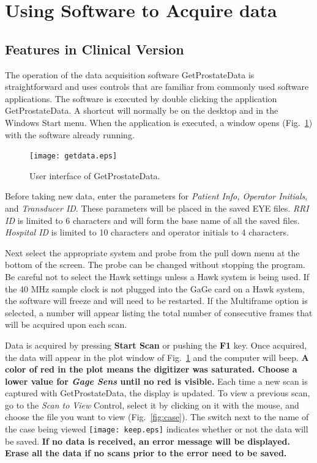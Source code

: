 \documentclass[10pt]{article}
\begin{document}
\section{Using Software to Acquire data}

\subsection{Features in Clinical Version}

The operation of the data acquisition software GetProstateData is
straightforward and uses controls that are familiar from commonly
used software applications. The software is executed by double
clicking the application GetProstateData. A shortcut will normally
be on the desktop and in the Windows Start menu. When the
application is executed, a window opens (Fig.~\ref{fig:getdata})
with the software already running.

\begin{figure}[htb]
\begin{center}
\texttt{[image: getdata.eps]}
 \caption{User interface of GetProstateData.}
 \label{fig:getdata}
\end{center}
\end{figure}

Before taking new data, enter the parameters for {\it Patient
Info, Operator Initials}, and {\it Transducer ID}. These
parameters will be placed in the saved EYE files. {\it RRI ID} is
limited to 6 characters and will form the base name of all the
saved files. {\it Hospital ID} is limited to 10 characters and
operator initials to 4 characters.

Next select the appropriate system and probe from the pull down
menu at the bottom of the screen. The probe can be changed without
stopping the program. Be careful not to select the Hawk settings
unless a Hawk system is being used. If the 40 MHz sample clock is
not plugged into the GaGe card on a Hawk system, the software will
freeze and will need to be restarted. If the Multiframe option is
selected, a number will appear listing the total number of
consecutive frames that will be acquired upon each scan.

Data is acquired by pressing {\bf Start Scan} or pushing the {\bf
F1} key. Once acquired, the data will appear in the plot window of
Fig.~\ref{fig:getdata} and the computer will beep. {\bf A color of
red in the plot means the digitizer was saturated. Choose a lower
value for {\it Gage Sens} until no red is visible.} Each time a
new scan is captured with GetProstateData, the display is updated.
To view a previous scan, go to the {\it Scan to View} Control,
select it by clicking on it with the mouse, and choose the file
you want to view (Fig.~\ref{fig:case}). The switch next to the
name of the case being viewed
\texttt{[image: keep.eps]} indicates whether or not the data will
be saved. {\bf If no data is received, an error message will be
displayed. Erase all the data if no scans prior to the error need
to be saved.}
\end{document}
